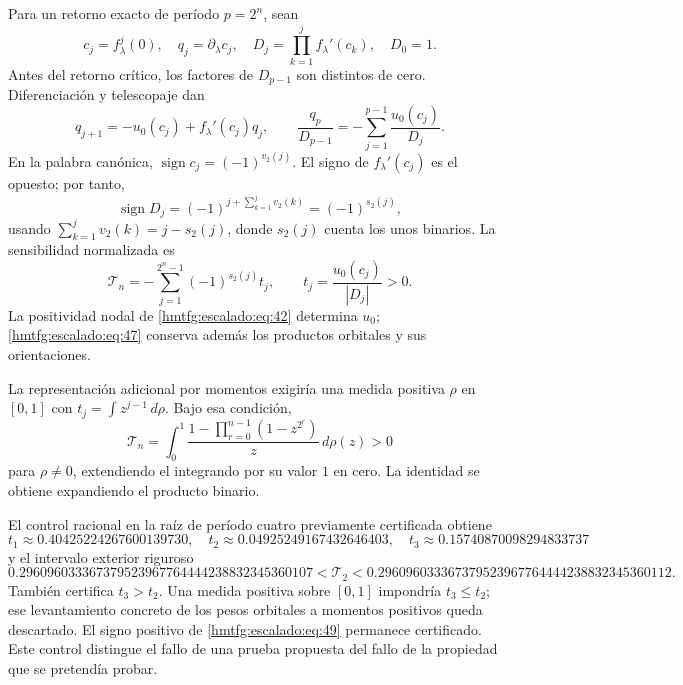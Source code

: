 Para un retorno exacto de período \(p=2^n\), sean
\[
c_j=f_\lambda^j(0),\quad q_j=\partial_\lambda c_j,\quad
D_j=\prod_{k=1}^j f_\lambda'(c_k),\quad D_0=1.
\]
Antes del retorno crítico, los factores de \(D_{p-1}\) son distintos de cero. Diferenciación y telescopaje dan
\begin{equation}
q_{j+1}=-u_0(c_j)+f_\lambda'(c_j)q_j,\qquad
\boxed{\frac{q_p}{D_{p-1}}
=-\sum_{j=1}^{p-1}\frac{u_0(c_j)}{D_j}.}
\label{hmtfg:escalado:eq:45}
\end{equation}
En la palabra canónica, \(\operatorname{sign}c_j=(-1)^{v_2(j)}\). El signo de \(f_\lambda'(c_j)\) es el opuesto; por tanto,
\begin{equation}
\operatorname{sign}D_j=(-1)^{j+\sum_{k=1}^jv_2(k)}
=(-1)^{s_2(j)},
\label{hmtfg:escalado:eq:46}
\end{equation}
usando \(\sum_{k=1}^jv_2(k)=j-s_2(j)\), donde \(s_2(j)\) cuenta los unos binarios. La sensibilidad normalizada es
\begin{equation}
\mathcal T_n=-\sum_{j=1}^{2^n-1}(-1)^{s_2(j)}t_j,\qquad
t_j=\frac{u_0(c_j)}{|D_j|}>0.
\label{hmtfg:escalado:eq:47}
\end{equation}
La positividad nodal de \eqref{hmtfg:escalado:eq:42} determina \(u_0\); \eqref{hmtfg:escalado:eq:47} conserva además los productos orbitales y sus orientaciones.

La representación adicional por momentos exigiría una medida positiva \(\rho\) en \([0,1]\) con \(t_j=\int z^{j-1}\,d\rho\). Bajo esa condición,
\begin{equation}
\mathcal T_n=\int_0^1
\frac{1-\prod_{r=0}^{n-1}(1-z^{2^r})}{z}\,d\rho(z)>0
\label{hmtfg:escalado:eq:48}
\end{equation}
para \(\rho\ne0\), extendiendo el integrando por su valor \(1\) en cero. La identidad se obtiene expandiendo el producto binario.

El control racional en la raíz de período cuatro previamente certificada obtiene
\[
t_1\approx0.40425224267600139730,\quad
t_2\approx0.04925249167432646403,\quad
t_3\approx0.15740870098294833737
\]
y el intervalo exterior riguroso
\begin{equation}
0.296096033367379523967764444238832345360107
<\mathcal T_2<
0.296096033367379523967764444238832345360112.
\label{hmtfg:escalado:eq:49}
\end{equation}
También certifica \(t_3>t_2\). Una medida positiva sobre \([0,1]\) impondría \(t_3\le t_2\); ese levantamiento concreto de los pesos orbitales a momentos positivos queda descartado. El signo positivo de \eqref{hmtfg:escalado:eq:49} permanece certificado. Este control distingue el fallo de una prueba propuesta del fallo de la propiedad que se pretendía probar.
